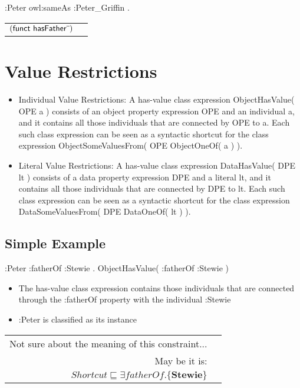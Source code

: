 \documentclass{llncs}
\newenvironment{DL}{
	\begin{center}
  \begin{tabular}{r l}

}{
  \end{tabular}
	\end{center}
}
\begin{document}
\begin{ex}
:Peter owl:sameAs :Peter_Griffin . 
\end{ex}

\begin{DL}
$(\textsf{funct } \textsf{hasFather}\sp{\overline{\ }})$
\end{DL}

\section{Value Restrictions}



\begin{itemize}
	\item Individual Value Restrictions: A has-value class expression ObjectHasValue( OPE a ) consists of an object property expression OPE and an individual a, and it contains all those individuals that are connected by OPE to a. Each such class expression can be seen as a syntactic shortcut for the class expression ObjectSomeValuesFrom( OPE ObjectOneOf( a ) ). 
	\item Literal Value Restrictions: A has-value class expression DataHasValue( DPE lt ) consists of a data property expression DPE and a literal lt, and it contains all those individuals that are connected by DPE to lt. Each such class expression can be seen as a syntactic shortcut for the class expression DataSomeValuesFrom( DPE DataOneOf( lt ) ).
\end{itemize}

\subsection{Simple Example}

\begin{ex}
:Peter :fatherOf :Stewie . 
ObjectHasValue( :fatherOf :Stewie )
\end{ex}

\begin{itemize}
	\item The has-value class expression contains those individuals that are connected through the :fatherOf property with the individual :Stewie
  \item :Peter is classified as its instance
\end{itemize}

\begin{DL}
Not sure about the meaning of this constraint...\\
May be it is:\\
$Shortcut \sqsubseteq \exists fatherOf.\{\textbf{Stewie}\}$
\end{DL}
\end{document}
